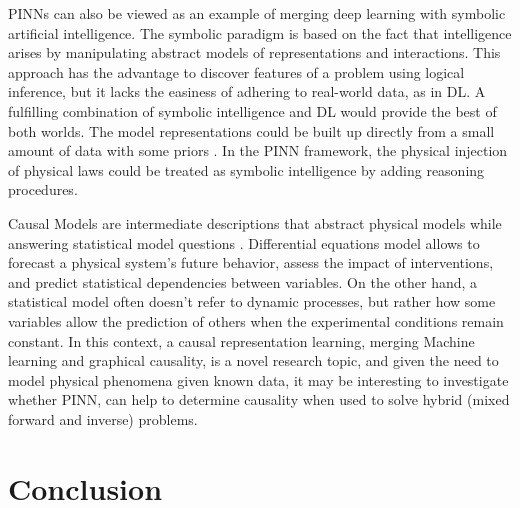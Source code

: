 \documentclass[pdflatex,sn-basic]{sn-jnl}%
\theoremstyle{thmstyleone}%
\theoremstyle{thmstyletwo}%
\theoremstyle{thmstylethree}%
\begin{document}
PINNs can also be viewed as an example of merging deep learning with symbolic artificial intelligence.
%
The symbolic paradigm is based on the fact that intelligence arises by manipulating abstract models of representations and interactions. 
This approach has the advantage to discover features of a problem using logical inference, but it lacks the easiness of adhering to real-world data, as in DL.
A fulfilling combination of symbolic intelligence and DL would provide the best of both worlds. The model representations could be built up directly from a small amount of data with some priors \citep{Gar2019_ReconcilingDeepLearning_ShaGS}.
%
In the PINN framework, the physical injection of physical laws could be treated as symbolic intelligence by adding reasoning procedures. 
\\
\noindent


Causal Models are intermediate descriptions that abstract physical models while answering statistical model questions 
\citep{Sch2021_CausalRepresentationLearning_LocSLB}.
Differential equations model allows to forecast a physical system's future behavior, assess the impact of interventions, and predict statistical dependencies between variables.
On the other hand, a statistical model often doesn't refer to dynamic processes, but rather how some variables allow the prediction of others when the experimental conditions remain constant.
In this context, a causal representation learning, merging Machine learning and graphical causality, is a novel research topic, and given the need to model physical phenomena given known data, it may be interesting to investigate whether PINN, can help to determine causality when used to solve hybrid (mixed forward and inverse) problems. 





\section{Conclusion}\label{sec_Disc}
\end{document}
